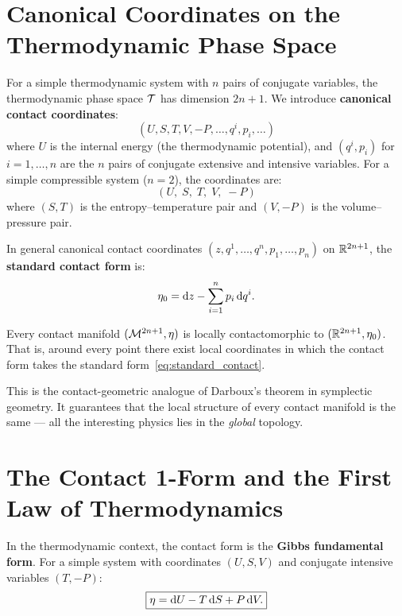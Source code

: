 \section{Canonical Coordinates on the Thermodynamic Phase Space}

For a simple thermodynamic system with $n$ pairs of conjugate variables, the thermodynamic phase space $\mathcal{T}$ has dimension $2n+1$. We introduce \textbf{canonical contact coordinates}:
\begin{equation}
(U, S, T, V, -P, \ldots, q^i, p_i, \ldots)
\end{equation}
where $U$ is the internal energy (the thermodynamic potential), and $(q^i, p_i)$ for $i = 1, \ldots, n$ are the $n$ pairs of conjugate extensive and intensive variables. For a simple compressible system ($n = 2$), the coordinates are:
\begin{equation}
(U,\; S,\; T,\; V,\; -P)
\end{equation}
where $(S, T)$ is the entropy--temperature pair and $(V, -P)$ is the volume--pressure pair.

In general canonical contact coordinates $(z, q^1, \ldots, q^n, p_1, \ldots, p_n)$ on $\mathbb{R}^{2n+1}$, the \textbf{standard contact form} is:
\begin{equation}\label{eq:standard_contact}
\eta_0 = \dd z - \sum_{i=1}^{n} p_i\, \dd q^i.
\end{equation}

\begin{proposition}
Every contact manifold $(\mathcal{M}^{2n+1}, \eta)$ is locally contactomorphic to $(\mathbb{R}^{2n+1}, \eta_0)$. That is, around every point there exist local coordinates in which the contact form takes the standard form~\eqref{eq:standard_contact}.
\end{proposition}

This is the contact-geometric analogue of Darboux's theorem in symplectic geometry. It guarantees that the local structure of every contact manifold is the same --- all the interesting physics lies in the \emph{global} topology.

\section{The Contact 1-Form and the First Law of Thermodynamics}

In the thermodynamic context, the contact form is the \textbf{Gibbs fundamental form}. For a simple system with coordinates $(U, S, V)$ and conjugate intensive variables $(T, -P)$:
\begin{equation}\label{eq:gibbs_form}
\boxed{\eta = \dd U - T\,\dd S + P\,\dd V.}
\end{equation}

